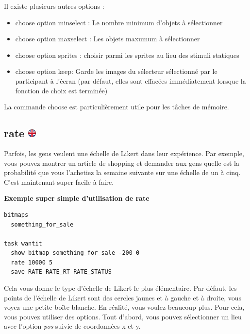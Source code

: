 \documentclass[
]{book}
\providecommand{\tightlist}{%
  \setlength{\itemsep}{0pt}\setlength{\parskip}{0pt}}
\begin{document}
Il existe plusieurs autres options :

\begin{itemize}
\tightlist
\item
  choose option minselect : Le nombre minimum d'objets à sélectionner
\item
  choose option maxselect : Les objets maxumum à sélectionner
\item
  choose option sprites : choisir parmi les sprites au lieu des stimuli statiques
\item
  choose option keep: Garde les images du sélecteur sélectionné par le participant à l'écran (par défaut, elles sont effacées immédiatement lorsque la fonction de choix est terminée)
\end{itemize}

La commande choose est particulièrement utile pour les tâches de mémoire.

\hypertarget{rate}{%
\subsection[rate ]{\texorpdfstring{rate \href{https://www.psytoolkit.org/doc3.4.0/syntax.html\#task-rate}{\protect\includegraphics{img/ukflag.png}}}{rate }}\label{rate}}

Parfois, les gens veulent une échelle de Likert dans leur expérience. Par exemple, vous pouvez montrer un article de shopping et demander aux gens quelle est la probabilité que vous l'achetiez la semaine suivante sur une échelle de un à cinq. C'est maintenant super facile à faire.

\textbf{Exemple super simple d'utilisation de rate}

\begin{verbatim}
bitmaps
  something_for_sale

task wantit
  show bitmap something_for_sale -200 0
  rate 10000 5
  save RATE RATE_RT RATE_STATUS
\end{verbatim}

Cela vous donne le type d'échelle de Likert le plus élémentaire. Par défaut, les points de l'échelle de Likert sont des cercles jaunes et à gauche et à droite, vous voyez une petite boîte blanche. En réalité, vous voulez beaucoup plus. Pour cela, vous pouvez utiliser des options. Tout d'abord, vous pouvez sélectionner un lieu avec l'option \emph{pos} suivie de coordonnées x et y.
\end{document}
